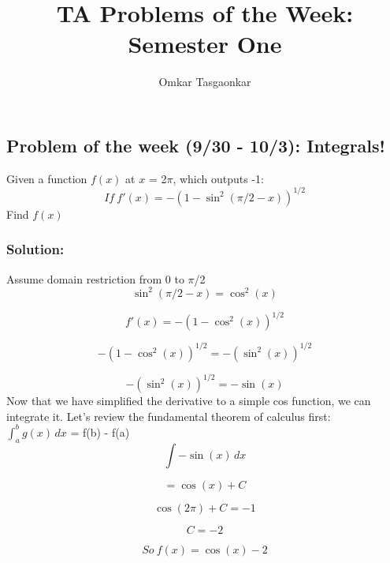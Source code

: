 \documentclass{article}
\title{TA Problems of the Week: Semester One}
\author{Omkar Tasgaonkar}
\begin{document}
\maketitle
\tableofcontents
\pagebreak

\subsection{Problem of the week (9/30 - 10/3): Integrals!}
Given a function $f(x)$ at $x$ = 2$\pi$, which outputs -1:\\


\begin{equation}
If\ f'(x) = -(1 - \sin^{2}(\pi/2 - x))^{1/2}
\end{equation}
Find $f(x)$\\


\subsubsection{Solution:}
Assume domain restriction from 0 to $\pi$/2\\


\begin{equation}
\sin^{2}(\pi/2 -x) = \cos^{2}(x)
\end{equation}

\begin{equation}
f'(x) = -(1 - \cos^{2}(x))^{1/2}
\end{equation}

\begin{equation}
-(1 - \cos^{2}(x))^{1/2} = -(\sin^{2}(x))^{1/2}
\end{equation}

\begin{equation}
-(\sin^{2}(x))^{1/2} = -\sin(x)
\end{equation}
Now that we have simplified the derivative to a simple cos function, we can integrate it. Let's review the fundamental theorem of calculus first: \\
\(\int_{a}^{b} g(x) \,dx \) = f(b) - f(a)\\

\[\int -\sin(x) \,dx \]

\begin{equation}
 = \cos(x) + C
\end{equation}

\begin{equation}
\cos(2\pi) + C = -1
\end{equation}

\begin{equation}
C = -2
\end{equation}

\begin{equation}
So\ f(x) = \cos(x) - 2
\end{equation}
\end{document}
